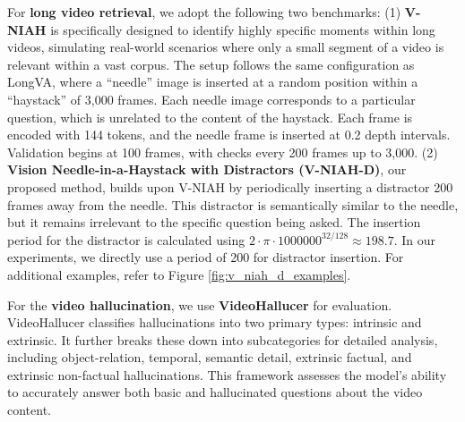 For \textbf{long video retrieval}, we adopt the following two benchmarks: (1) \textbf{V-NIAH} is specifically designed to identify highly specific moments within long videos, simulating real-world scenarios where only a small segment of a video is relevant within a vast corpus. The setup follows the same configuration as LongVA, where a ``needle'' image is inserted at a random position within a ``haystack'' of 3,000 frames. Each needle image corresponds to a particular question, which is unrelated to the content of the haystack. Each frame is encoded with 144 tokens, and the needle frame is inserted at 0.2 depth intervals. Validation begins at 100 frames, with checks every 200 frames up to 3,000. (2) \textbf{Vision Needle-in-a-Haystack with Distractors (V-NIAH-D)}, our proposed method, builds upon V-NIAH by periodically inserting a distractor 200 frames away from the needle. This distractor is semantically similar to the needle, but it remains irrelevant to the specific question being asked. The insertion period for the distractor is calculated using \( 2 \cdot \pi \cdot 1000000^{32/128} \approx 198.7 \). In our experiments, we directly use a period of 200 for distractor insertion. For additional examples, refer to Figure \ref{fig:v_niah_d_examples}.



For the \textbf{video hallucination}, we use \textbf{VideoHallucer} for evaluation. VideoHallucer classifies hallucinations into two primary types: intrinsic and extrinsic. It further breaks these down into subcategories for detailed analysis, including object-relation, temporal, semantic detail, extrinsic factual, and extrinsic non-factual hallucinations. This framework assesses the model’s ability to accurately answer both basic and hallucinated questions about the video content.


% 
% 

